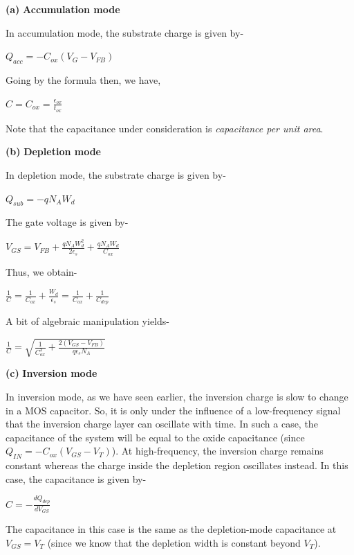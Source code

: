 \documentclass[12 pt]{article}
\begin{document}
\textbf{(a)} \textbf{Accumulation mode} \par
   In accumulation mode, the substrate charge is given by-
   \begin{center}
       $ Q_{acc} = -C_{ox}(V_{G}-V_{FB}) $
   \end{center}
  Going by the formula then, we have,
\begin{center}
    $ C = C_{ox} = \frac{\epsilon_{ox}}{t_{ox}}$
\end{center}
  Note that the capacitance under consideration is \emph{capacitance per unit area}. \par

\textbf{(b)} \textbf{Depletion mode} \par
    In depletion mode, the substrate charge is given by-
    \begin{center}
        $Q_{sub} = -qN_{A}W_{d}$
    \end{center}
    The gate voltage is given by-
    \begin{center}
        $V_{GS} = V_{FB} + \frac{qN_{A}W_{d}^{2}}{2\epsilon_{s}} + \frac{qN_{A}W_{d}}{C_{ox}}$
    \end{center}
    Thus, we obtain-
    \begin{center}
        $\frac{1}{C} = \frac{1}{C_{ox}} + \frac{W_{d}}{\epsilon_{s}} = \frac{1}{C_{ox}} + \frac{1}{C_{dep}}$
    \end{center}
   A bit of algebraic manipulation yields-
   \begin{center}
       $\frac{1}{C} = \sqrt{\frac{1}{C_{ox}^{2}} + \frac{2(V_{GS}-V_{FB})}{q\epsilon_{s}N_{A}}}$
   \end{center}
   
\textbf{(c)} \textbf{Inversion mode} \par
    In inversion mode, as we have seen earlier, the inversion charge is slow to change in a MOS capacitor. So, it is only under the influence of a low-frequency signal that the inversion charge layer can oscillate with time. In such a case, the capacitance of the system will be equal to the oxide capacitance (since $Q_{IN} = -C_{ox}(V_{GS}-V_{T})$). At high-frequency, the inversion charge remains constant whereas the charge inside the depletion region oscillates instead. In this case, the capacitance is given by-
    \begin{center}
        $C = -\frac{dQ_{dep}}{dV_{GS}}$
    \end{center}
    The capacitance in this case is the same as the depletion-mode capacitance at $V_{GS} = V_{T}$ (since we know that the depletion width is constant beyond $V_{T}$). \par
    
\end{document}
